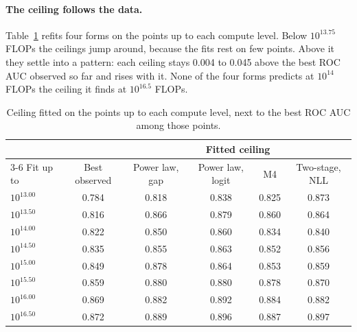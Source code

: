\paragraph{The ceiling follows the data.}
Table~\ref{tab:ceiling-drift} refits four forms on the points up to each compute level. Below $10^{13.75}$ FLOPs the
ceilings jump around, because the fits rest on few points. Above it they settle into a pattern: each ceiling stays
0.004 to 0.045 above the best ROC AUC observed so far and rises with it. None of the four forms predicts at $10^{14}$ FLOPs
the ceiling it finds at $10^{16.5}$ FLOPs.

\begin{table}[h]
  \centering
  \caption{Ceiling fitted on the points up to each compute level, next to the best ROC AUC among those points.}
  \label{tab:ceiling-drift}
  \small
  \begin{tabular}{lccccc}
    \toprule
    & & \multicolumn{4}{c}{Fitted ceiling} \\
    \cmidrule(lr){3-6}
    Fit up to & Best observed & Power law, gap & Power law, logit & M4 & Two-stage, NLL \\
    \midrule
    $10^{13.00}$ & 0.784 & 0.818 & 0.838 & 0.825 & 0.873 \\
    $10^{13.50}$ & 0.816 & 0.866 & 0.879 & 0.860 & 0.864 \\
    $10^{14.00}$ & 0.822 & 0.850 & 0.860 & 0.834 & 0.840 \\
    $10^{14.50}$ & 0.835 & 0.855 & 0.863 & 0.852 & 0.856 \\
    $10^{15.00}$ & 0.849 & 0.878 & 0.864 & 0.853 & 0.859 \\
    $10^{15.50}$ & 0.859 & 0.880 & 0.880 & 0.878 & 0.870 \\
    $10^{16.00}$ & 0.869 & 0.882 & 0.892 & 0.884 & 0.882 \\
    $10^{16.50}$ & 0.872 & 0.889 & 0.896 & 0.887 & 0.897 \\
    \bottomrule
  \end{tabular}
\end{table}

